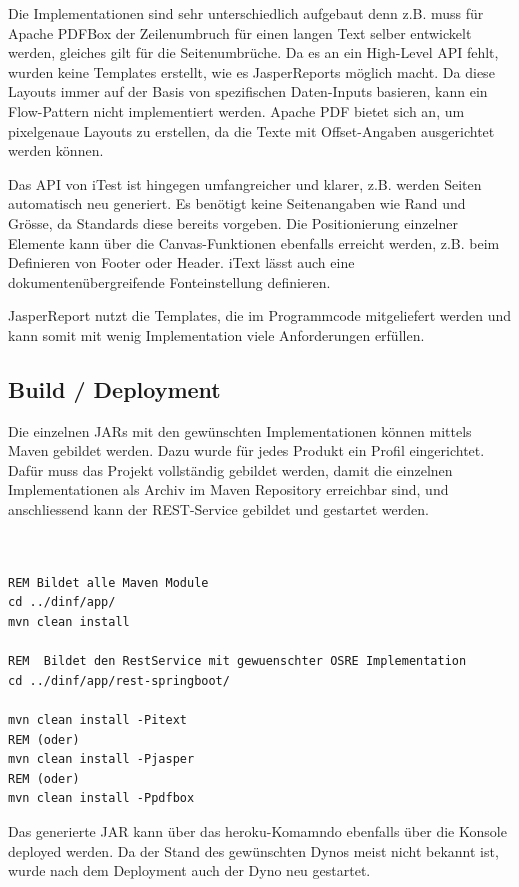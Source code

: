 \documentclass[main.tex]{subfiles}
\begin{document}
Die Implementationen sind sehr unterschiedlich aufgebaut denn z.B. muss für Apache PDFBox der Zeilenumbruch für einen langen Text selber entwickelt werden,  gleiches gilt für die Seitenumbrüche. Da es an  ein High-Level API fehlt, wurden keine Templates erstellt, wie es  JasperReports möglich macht. Da diese Layouts immer auf der Basis von spezifischen Daten-Inputs basieren, kann ein Flow-Pattern nicht implementiert werden. Apache PDF bietet sich an, um pixelgenaue Layouts zu erstellen, da die Texte mit Offset-Angaben ausgerichtet werden können.

Das API von iTest ist hingegen umfangreicher und klarer, z.B. werden Seiten automatisch neu generiert. Es benötigt keine Seitenangaben wie Rand und Grösse, da Standards diese bereits vorgeben.  Die Positionierung einzelner Elemente kann über die Canvas-Funktionen ebenfalls erreicht werden, z.B. beim Definieren von Footer oder Header. iText lässt auch eine dokumentenübergreifende Fonteinstellung definieren.

JasperReport nutzt die Templates, die im Programmcode mitgeliefert werden und kann somit mit wenig Implementation viele Anforderungen erfüllen. 


\subsection{Build / Deployment}

Die einzelnen JARs mit den gewünschten Implementationen können mittels Maven gebildet werden. Dazu wurde für jedes Produkt ein Profil eingerichtet. Dafür muss das Projekt vollständig gebildet werden, damit die einzelnen Implementationen als Archiv im Maven Repository erreichbar sind, und anschliessend kann der REST-Service gebildet und gestartet werden.  

\begin{lstlisting}[language=command.com,caption={CLI Installationskommandos},captionpos=b]


REM Bildet alle Maven Module 
cd ../dinf/app/ 
mvn clean install 

REM  Bildet den RestService mit gewuenschter OSRE Implementation     
cd ../dinf/app/rest-springboot/

mvn clean install -Pitext
REM (oder)
mvn clean install -Pjasper
REM (oder)
mvn clean install -Ppdfbox
\end{lstlisting}


Das generierte JAR kann über das heroku-Komamndo ebenfalls über die Konsole deployed werden. Da der Stand des gewünschten Dynos meist nicht bekannt ist, wurde nach dem Deployment auch der Dyno neu gestartet. 
\end{document}
